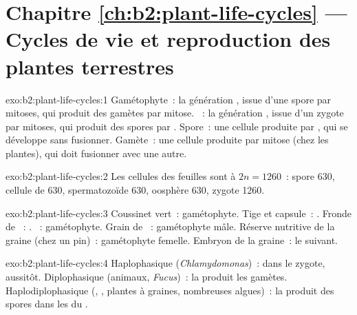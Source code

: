 \section*{Chapitre \ref{ch:b2:plant-life-cycles} --- Cycles de vie et reproduction des plantes terrestres}

\begin{solution}{exo:b2:plant-life-cycles:1}
Gamétophyte~: la génération  , issue d'une spore
par mitoses, qui produit des gamètes par mitose. ~: la
génération , issue d'un zygote par mitoses, qui produit des
spores par . Spore~: une cellule  produite par , qui
se développe sans fusionner. Gamète~: une cellule  produite par
mitose (chez les plantes), qui doit fusionner avec une autre.
\end{solution}

\begin{solution}{exo:b2:plant-life-cycles:2}
Les cellules des feuilles sont à $2n = 1260$~: spore 630, cellule de
 630, spermatozoïde 630, oosphère 630, zygote 1260.
\end{solution}

\begin{solution}{exo:b2:plant-life-cycles:3}
Coussinet vert~: gamétophyte. Tige et capsule~: . Fronde de
~: . ~: gamétophyte. Grain de ~:
gamétophyte mâle. Réserve nutritive de la graine (chez un pin)~:
gamétophyte femelle. Embryon de la graine~: le  suivant.
\end{solution}

\begin{solution}{exo:b2:plant-life-cycles:4}
Haplophasique (\emph{Chlamydomonas})~:  dans le zygote, aussitôt.
Diplophasique (animaux, \emph{Fucus})~: la  produit les gamètes.
Haplodiplophasique (, , plantes à graines, nombreuses
algues)~: la  produit des spores dans les  du
.
\end{solution}

